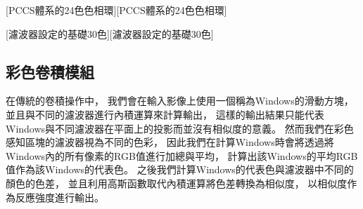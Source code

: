 \documentclass[class=NCU_thesis, crop=false]{standalone}
\begin{document}
	[PCCS體系的24色色相環\cite{PCCScite}][PCCS體系的24色色相環]

	[濾波器設定的基礎30色][濾波器設定的基礎30色]

	\subsection{彩色卷積模組}
	在傳統的卷積操作中，
	我們會在輸入影像上使用一個稱為Windows的滑動方塊，
	並且與不同的濾波器進行內積運算來計算輸出，
	這樣的輸出結果只能代表Windows與不同濾波器在平面上的投影而並沒有相似度的意義。
	然而我們在彩色感知區塊的濾波器視為不同的色彩，
	因此我們在計算Windows時會將透過將Windows內的所有像素的RGB值進行加總與平均，
	計算出該Windows的平均RGB值作為該Windows的代表色。
	之後我們計算Windows的代表色與濾波器中不同的顏色的色差，
	並且利用高斯函數取代內積運算將色差轉換為相似度，
	以相似度作為反應強度進行輸出。
\end{document}
